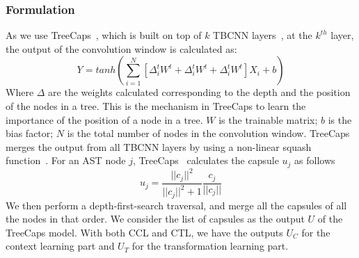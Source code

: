 \subsubsection*{\bf Formulation}
As we use TreeCaps~\cite{bui2021treecaps}, which is built on top of
$k$ TBCNN layers~\cite{mou2014tbcnn}, at the $k^{th}$ layer, the
output of the convolution window is calculated as:
\begin{equation}\label{eq:treecaps}
	Y = tanh(\sum_{i=1}^{N}[\Delta^t_iW^t + \Delta^t_iW^t + \Delta^t_iW^t]X_i + b)
\end{equation}
Where $\Delta$ are the weights calculated corresponding to the depth
and the position of the nodes in a tree. This is the mechanism in
TreeCaps to learn the importance of the position of a node in a
tree. $W$ is the trainable matrix; $b$ is the bias factor; $N$ is the
total number of nodes in the convolution window. TreeCaps merges the
output from all TBCNN layers by using a non-linear squash
function~\cite{sabour2017dynamic}. For an AST node $j$,
TreeCaps~\cite{bui2021treecaps} calculates the capsule $u_j$ as
follows
\begin{equation}\label{eq:2}
	u_j = \frac{||c_j||^2}{||c_j||^2+1}\frac{c_j}{||c_j||}
\end{equation}
We then perform a depth-first-search traversal, and merge all the
capsules of all the nodes in that order. We consider the list of
capsules as the output $U$ of the TreeCaps model. With both
CCL and CTL, we have the outputs $U_C$ for the context
learning part and $U_T$ for the transformation learning part.



